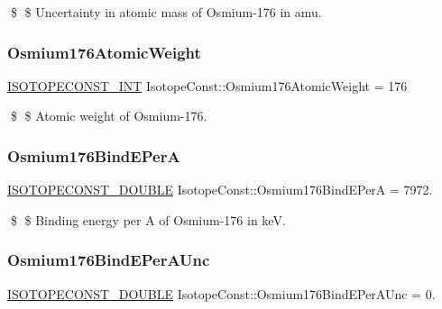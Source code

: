 \$ \$ Uncertainty in atomic mass of Osmium-\/176 in amu. \mbox{\label{group___isotope_const-_osmium-_os176_ga48d22288acc7f2bc323025034151a7ec}} 
\subsubsection{\texorpdfstring{Osmium176\+Atomic\+Weight}{Osmium176AtomicWeight}}
{\footnotesize\ttfamily \mbox{\hyperlink{group___isotope_const-_macros_ga5f18360b3e99483a35c32d789e62621c}{I\+S\+O\+T\+O\+P\+E\+C\+O\+N\+S\+T\+\_\+\+I\+NT}} Isotope\+Const\+::\+Osmium176\+Atomic\+Weight = 176}

\$ \$ Atomic weight of Osmium-\/176. \mbox{\label{group___isotope_const-_osmium-_os176_ga507ab1822a3f830c45795d111a3ab6eb}} 
\subsubsection{\texorpdfstring{Osmium176\+Bind\+E\+PerA}{Osmium176BindEPerA}}
{\footnotesize\ttfamily \mbox{\hyperlink{group___isotope_const-_macros_ga8f45a7272ce02c0b4c65c44636ed719a}{I\+S\+O\+T\+O\+P\+E\+C\+O\+N\+S\+T\+\_\+\+D\+O\+U\+B\+LE}} Isotope\+Const\+::\+Osmium176\+Bind\+E\+PerA = 7972.}

\$ \$ Binding energy per A of Osmium-\/176 in keV. \mbox{\label{group___isotope_const-_osmium-_os176_ga528c2d8ba304bbb2f39f83ccfa911f84}} 
\subsubsection{\texorpdfstring{Osmium176\+Bind\+E\+Per\+A\+Unc}{Osmium176BindEPerAUnc}}
{\footnotesize\ttfamily \mbox{\hyperlink{group___isotope_const-_macros_ga8f45a7272ce02c0b4c65c44636ed719a}{I\+S\+O\+T\+O\+P\+E\+C\+O\+N\+S\+T\+\_\+\+D\+O\+U\+B\+LE}} Isotope\+Const\+::\+Osmium176\+Bind\+E\+Per\+A\+Unc = 0.}

